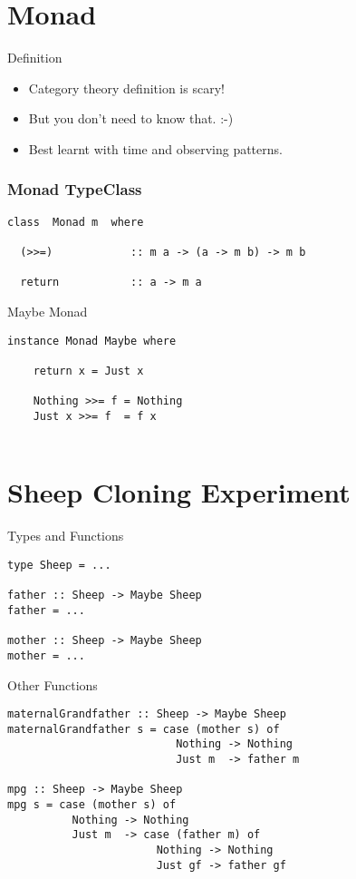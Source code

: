 \documentclass{beamer}
\begin{document}
\section{Monad}

\begin{frame}{Definition}
  \begin{itemize}
  \item Category theory definition is scary!
  \item But you don't need to know that. :-)
  \item Best learnt with time and observing patterns.
  \end{itemize}
\end{frame}  

\begin{frame}[fragile]
\frametitle{Monad TypeClass}

\begin{lstlisting}
class  Monad m  where

  (>>=)            :: m a -> (a -> m b) -> m b

  return           :: a -> m a 
\end{lstlisting}
\end{frame}


\begin{frame}[fragile]{Maybe Monad}
\begin{lstlisting}
instance Monad Maybe where

    return x = Just x

    Nothing >>= f = Nothing  
    Just x >>= f  = f x
  
\end{lstlisting}
  
\end{frame}

\section{Sheep Cloning Experiment}

\begin{frame}[fragile]{Types and Functions}
  \begin{lstlisting}
type Sheep = ...

father :: Sheep -> Maybe Sheep
father = ...

mother :: Sheep -> Maybe Sheep
mother = ...
\end{lstlisting}
  
\end{frame}

\begin{frame}[fragile]{Other Functions}
\begin{lstlisting}
maternalGrandfather :: Sheep -> Maybe Sheep
maternalGrandfather s = case (mother s) of
                          Nothing -> Nothing
                          Just m  -> father m

mpg :: Sheep -> Maybe Sheep
mpg s = case (mother s) of
          Nothing -> Nothing
          Just m  -> case (father m) of
                       Nothing -> Nothing
                       Just gf -> father gf
\end{lstlisting}
\end{frame}
\end{document}
